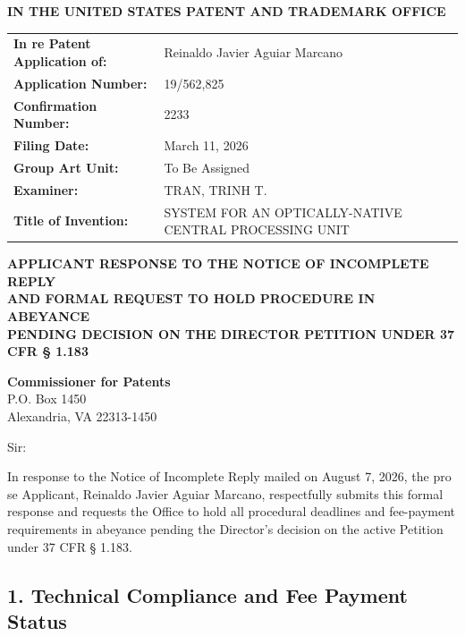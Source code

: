 \documentclass[11pt,letterpaper]{article}
\begin{document}
\thispagestyle{empty}

\begin{center}
    \large\textbf{IN THE UNITED STATES PATENT AND TRADEMARK OFFICE} \\
\end{center}

\vspace{0.5cm}
\noindent\begin{tabular}{p{2.3in}p{4.0in}}
\textbf{In re Patent Application of:} & Reinaldo Javier Aguiar Marcano \\
\textbf{Application Number:} & 19/562,825 \\
\textbf{Confirmation Number:} & 2233 \\
\textbf{Filing Date:} & March 11, 2026 \\
\textbf{Group Art Unit:} & To Be Assigned \\
\textbf{Examiner:} & TRAN, TRINH T. \\
\textbf{Title of Invention:} & SYSTEM FOR AN OPTICALLY-NATIVE CENTRAL PROCESSING UNIT \\
\end{tabular}

\vspace{1.0cm}
\begin{center}
    \textbf{APPLICANT RESPONSE TO THE NOTICE OF INCOMPLETE REPLY \\
    AND FORMAL REQUEST TO HOLD PROCEDURE IN ABEYANCE \\
    PENDING DECISION ON THE DIRECTOR PETITION UNDER 37 CFR \S{} 1.183}
\end{center}

\vspace{0.5cm}
\noindent\textbf{Commissioner for Patents} \\
\noindent P.O. Box 1450 \\
\noindent Alexandria, VA 22313-1450

\vspace{0.5cm}
\noindent Sir:

\noindent In response to the Notice of Incomplete Reply mailed on August 7, 2026, the pro se Applicant, Reinaldo Javier Aguiar Marcano, respectfully submits this formal response and requests the Office to hold all procedural deadlines and fee-payment requirements in abeyance pending the Director's decision on the active Petition under 37 CFR \S{} 1.183.

\subsection*{1. Technical Compliance and Fee Payment Status}
\end{document}
